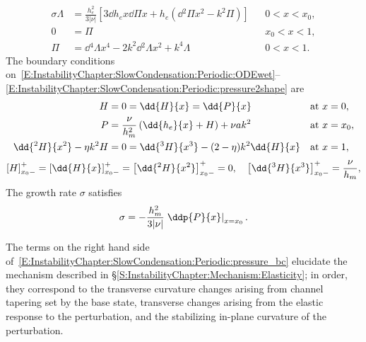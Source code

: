 \begin{align}
\sigma \Lambda &=  \frac{h_e^2}{3|\nu|}\left[3\dd{h_e}{x} \dd{\Pi}{x} + h_e\left(\dd{^2 \Pi}{x^2} - k^2 \Pi\right)\right] & &0 < x < x_0,\label{E:InstabilityChapter:SlowCondensation:Periodic:ODEwet}\\
0 &= \Pi & &x_0 < x < 1,\label{E:InstabilityChapter:SlowCondensation:Periodic:ODEdry}\\
\Pi &= \dd{^4 \Lambda}{x^4} - 2k^2 \dd{^2 \Lambda}{x^2} + k^4 \Lambda & & 0 < x <1.\label{E:InstabilityChapter:SlowCondensation:Periodic:pressure2shape}
\end{align}
The boundary conditions on~\eqref{E:InstabilityChapter:SlowCondensation:Periodic:ODEwet}--\eqref{E:InstabilityChapter:SlowCondensation:Periodic:pressure2shape} are
\begin{align}
\Lambda &= 0 = \dd{\Lambda}{x} = \dd{\Pi}{x} & &\text{at}~x = 0,\label{E:InstabilityChapter:SlowCondensation:Periodic:BC_at_0}\\
\Pi &= \frac{\nu}{h_m^2}\left(\dd{h_e}{x} + \Lambda\right) + \nu \aspect k^2 & &\text{at}~x = x_0,\label{E:InstabilityChapter:SlowCondensation:Periodic:pressure_bc}\\
\dd{^2 \Lambda}{x^2} - \poisson k^2
\Lambda &= 0 = \dd{^3 \Lambda}{x^3} - (2-\poisson)k^2 \dd{\Lambda}{x} & &\text{at}~x = 1,\label{E:InstabilityChapter:SlowCondensation:Periodic:BC_at_1}
\end{align}
\begin{equation}\label{E:InstabilityChapter:SlowCondensation:Periodic:jump_conds}
\left[\Lambda\right]\jump{x_0}= \left[\dd{\Lambda}{x}\right]\jump{x_0} = \left[\dd{^2\Lambda}{x^2}\right]\jump{x_0}= 0, \quad\left[\dd{^3 \Lambda}{x^3}\right]\jump{x_0} = \frac{\nu}{h_m },
\end{equation}
The growth rate $\sigma$ satisfies
\begin{equation}\label{E:InstabilityChapter:SlowCondensation:Periodic:kinematic}
\sigma = -\frac{h_m^2}{3|\nu|}\left.\ddp{\Pi}{x}\right|_{x = x_0}.
\end{equation}

The terms on the right hand side of~\eqref{E:InstabilityChapter:SlowCondensation:Periodic:pressure_bc} elucidate the mechanism described in \S\ref{S:InstabilityChapter:Mechanism:Elasticity}; in order, they correspond to the transverse curvature changes arising from channel tapering set by the base state, transverse changes arising from the elastic response to the perturbation, and the stabilizing in-plane curvature of the perturbation. 

